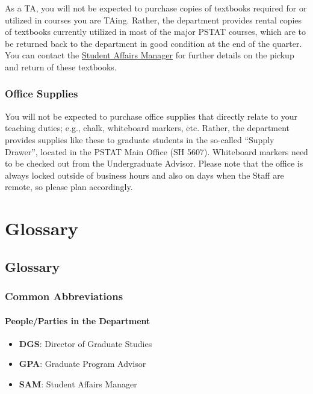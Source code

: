 \documentclass[
  letterpaper,
  DIV=11,
  numbers=noendperiod]{scrreprt}
\begin{document}
As a TA, you will not be expected to purchase copies of textbooks
required for or utilized in courses you are TAing. Rather, the
department provides rental copies of textbooks currently utilized in
most of the major PSTAT courses, which are to be returned back to the
department in good condition at the end of the quarter. You can contact
the \protect\hyperlink{sec-StaffandFacultyContact}{Student Affairs
Manager} for further details on the pickup and return of these
textbooks.

\hypertarget{office-supplies}{%
\section{Office Supplies}\label{office-supplies}}

You will not be expected to purchase office supplies that directly
relate to your teaching duties; e.g., chalk, whiteboard markers, etc.
Rather, the department provides supplies like these to graduate students
in the so-called ``Supply Drawer'', located in the PSTAT Main Office (SH
5607). Whiteboard markers need to be checked out from the Undergraduate
Advisor. Please note that the office is always locked outside of
business hours and also on days when the Staff are remote, so please
plan accordingly.

\part{\textbf{Glossary}}

\hypertarget{glossary-1}{%
\chapter{Glossary}\label{glossary-1}}

\hypertarget{common-abbreviations}{%
\section{Common Abbreviations}\label{common-abbreviations}}

\hypertarget{peopleparties-in-the-department}{%
\subsection{People/Parties in the
Department}\label{peopleparties-in-the-department}}

\begin{itemize}
\item
  \textbf{DGS}: Director of Graduate Studies
\item
  \textbf{GPA}: Graduate Program Advisor
\item
  \textbf{SAM}: Student Affairs Manager
\end{itemize}
\end{document}
